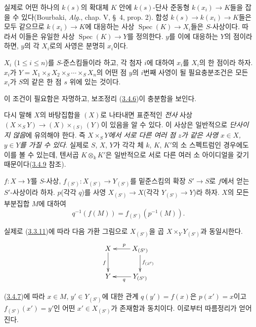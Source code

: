 실제로 어떤 하나의 $k(s)$의 확대체 $K$ 안에 $k(s)$-단사 준동형
$k(x_i)\to K$들을 잡을 수 있다(Bourbaki, \emph{Alg.}, chap. V,
\S~4, prop. 2). 합성 $k(s)\to k(x_i)\to K$들은 모두 같으므로
$k(x_i)\to K$에 대응하는 사상 $\operatorname{Spec}(K)\to X_i$들은
$S$-사상이다. 따라서 이들은 유일한 사상
$\operatorname{Spec}(K)\to Y$를 정의한다. $y$를 이에 대응하는
$Y$의 점이라 하면, $y$의 각 $X_i$로의 사영은 분명히 $x_i$이다.

\begin{proposition}[3.4.7]
\label{I.3.4.7-ko}
$X_i$ ($1\leq i\leq n$)를 $S$-준스킴들이라 하고, 각 첨자 $i$에
대하여 $x_i$를 $X_i$의 한 점이라 하자. $x_i$가
$Y=X_1\times_S X_2\times_S\cdots\times_S X_n$의 어떤 점 $y$의
$i$번째 사영이 될 필요충분조건은 모든 $x_i$가 $S$의 같은 한 점
$s$ 위에 있는 것이다.
\end{proposition}

이 조건이 필요함은 자명하고, 보조정리
(\hyperref[I.3.4.6-ko]{3.4.6})이 충분함을 보인다.

\label{I.3.4.7.underlying-map-ko}
다시 말해 $X$의 바탕집합을 $(X)$로 나타내면 표준적인 \emph{전사}
사상 $(X\times_S Y)\to (X)\times_{(S)}(Y)$이 있음을 알 수 있다.
이 사상은 일반적으로 \emph{단사이지 않음}에 유의해야 한다. 즉
\emph{$X\times_S Y$에서 서로 다른 여러 점 $z$가 같은 사영
$x\in X$, $y\in Y$를 가질 수 있다}. 실제로 $S$, $X$, $Y$가 각각
체 $k$, $K$, $K'$의 소 스펙트럼인 경우에도 이를 볼 수 있는데,
텐서곱 $K\otimes_k K'$은 일반적으로 서로 다른 여러 소 아이디얼을
갖기 때문이다(\hyperref[I.3.4.9-ko]{3.4.9} 참조).

\begin{corollary}[3.4.8]
\label{I.3.4.8-ko}
$f:X\to Y$를 $S$-사상, $f_{(S')}:X_{(S')}\to Y_{(S')}$를
밑준스킴의 확장 $S'\to S$로 $f$에서 얻는 $S'$-사상이라 하자.
$p$(각각 $q$)를 사영 $X_{(S')}\to X$(각각 $Y_{(S')}\to Y$)라
하자. $X$의 모든 부분집합 $M$에 대하여
\label{I.3.4.8.base-change-image-ko}
\[
  q^{-1}(f(M))=f_{(S')}(p^{-1}(M)).
\]
\end{corollary}

실제로 (\hyperref[I.3.3.11-ko]{3.3.11})에 따라 다음 가환 그림으로
$X_{(S')}$을 곱 $X\times_Y Y_{(S')}$과 동일시한다.
\label{I.3.4.8.proof-diagram-ko}
\[
  \xymatrix{
    X\ar[d]_f & X_{(S')}\ar[l]_p\ar[d]^{f_{(S')}}\\
    Y & Y_{(S')}\ar[l]^q
  }
\]

(\hyperref[I.3.4.7-ko]{3.4.7})에 따라 $x\in M$,
$y'\in Y_{(S')}$에 대한 관계 $q(y')=f(x)$은
$p(x')=x$이고 $f_{(S')}(x')=y'$인 어떤 $x'\in X_{(S')}$가
존재함과 동치이다. 이로부터 따름정리가 얻어진다.

